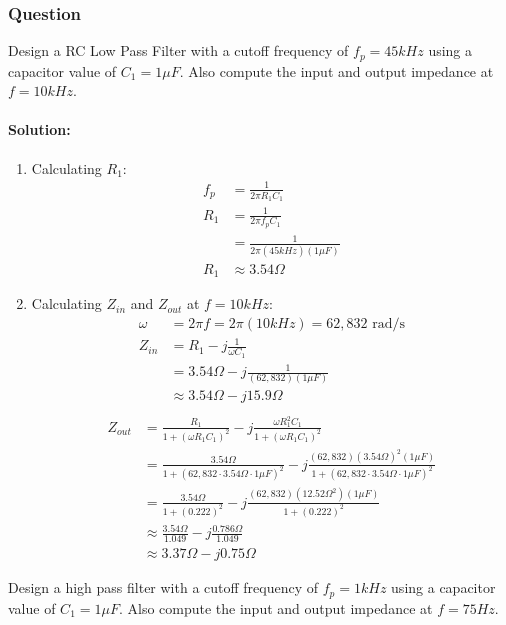 \subsubsection{Question}
Design a RC Low Pass Filter with a cutoff frequency of
\(f_p = 45kHz\) using a capacitor value of \(C_1 = 1\mu F\).
Also compute the input and output impedance at
\(f = 10kHz\).
\paragraph{Solution:}
\begin{enumerate}
  \item Calculating \(R_1\):
    \begin{align*}
      f_p &= \frac{1}{2 \pi R_1 C_1} \\
      R_1 &= \frac{1}{2 \pi f_p C_1} \\
      &= \frac{1}{2 \pi (45kHz)(1\mu F)} \\
      R_1 &\approx 3.54 \Omega
    \end{align*}
  \item Calculating \(Z_{in}\) and \(Z_{out}\) at \(f = 10kHz\):
    \begin{align*}
      \omega &= 2 \pi f = 2 \pi (10kHz) = 62,832 \text{ rad/s} \\
      Z_{in} &= R_1 - j \frac{1}{\omega C_1} \\
             &= 3.54 \Omega - j \frac{1}{(62,832)(1\mu F)} \\
             &\approx 3.54 \Omega - j 15.9 \Omega \\
    \end{align*}
    \begin{align*}
            Z_{out} &= \frac{R_1}{1 + (\omega R_1 C_1)^2} - j \frac{\omega R_1^2 C_1}{1 + (\omega R_1 C_1)^2} \\
              &= \frac{3.54 \Omega}{1 + (62,832 \cdot 3.54 \Omega \cdot 1\mu F)^2} - j \frac{(62,832)(3.54 \Omega)^2 (1\mu F)}{1 + (62,832 \cdot 3.54 \Omega \cdot 1\mu F)^2} \\
              &= \frac{3.54 \Omega}{1 + (0.222)^2} - j \frac{(62,832)(12.52 \Omega^2)(1\mu F)}{1 + (0.222)^2} \\
              &\approx \frac{3.54 \Omega}{1.049} - j \frac{0.786 \Omega}{1.049} \\
              &\approx 3.37 \Omega - j 0.75 \Omega
    \end{align*}
\end{enumerate}
Design a high pass filter with a cutoff frequency of
\(f_p = 1kHz\) using a capacitor value of \(C_1 = 1\mu F\).
Also compute the input and output impedance at
\(f = 75Hz\).
